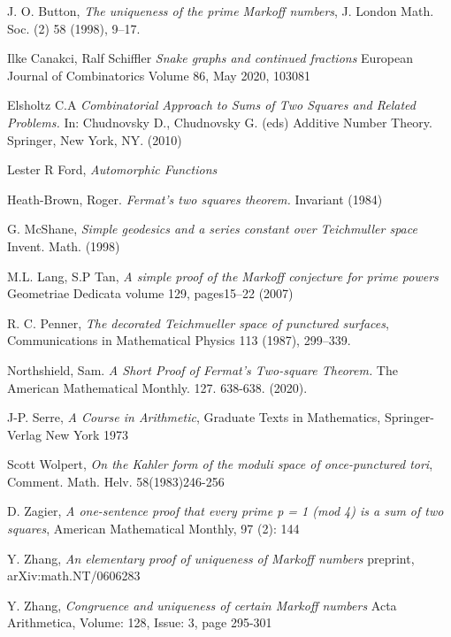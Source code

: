J. O. Button, 
\textit{The uniqueness of the prime Markoff numbers},
 J. London Math. Soc.
(2) 58 (1998), 9–17.

Ilke Canakci, Ralf Schiffler
\textit{Snake graphs and continued fractions}
European Journal of Combinatorics
Volume 86, May 2020, 103081

Elsholtz C.A 
\textit{Combinatorial Approach to Sums of Two Squares and Related Problems.}
 In: Chudnovsky D., Chudnovsky G. (eds) Additive Number Theory. Springer, New York, NY.
 (2010) 


Lester R Ford,
\textit{Automorphic Functions}

Heath-Brown, Roger. 
\textit{ Fermat’s two squares theorem.} Invariant (1984) 

G. McShane,
\textit{Simple geodesics and a series constant over Teichmuller space}
Invent. Math. (1998)

M.L. Lang, S.P Tan,
\textit{A simple proof of the Markoff conjecture for prime powers}
Geometriae Dedicata volume 129, pages15–22 (2007)

R. C. Penner, 
\textit{The decorated Teichmueller space of punctured surfaces}, 
Communications in Mathematical Physics 113 (1987), 299–339.


Northshield, Sam. 
\textit{A Short Proof of Fermat’s Two-square Theorem.} The American Mathematical Monthly. 127. 638-638. (2020). 

J-P. Serre,
\textit{A Course in Arithmetic},
Graduate Texts in Mathematics,
Springer-Verlag New York
1973

Scott Wolpert,
\textit{On the Kahler form of the moduli space of once-punctured tori}, 
Comment. Math. Helv. 58(1983)246-256

D. Zagier,
 \textit{A one-sentence proof that every prime p = 1 (mod 4) is a sum of two squares}, 
 American Mathematical Monthly, 97 (2): 144
 
 Y. Zhang,
 \textit{ An elementary proof of uniqueness of Markoff numbers}
 preprint, arXiv:math.NT/0606283
 
   Y. Zhang,
 \textit{Congruence and uniqueness of certain Markoff numbers}
 Acta Arithmetica, Volume: 128, Issue: 3, page 295-301




%
%
%
%
%
%
%
%



